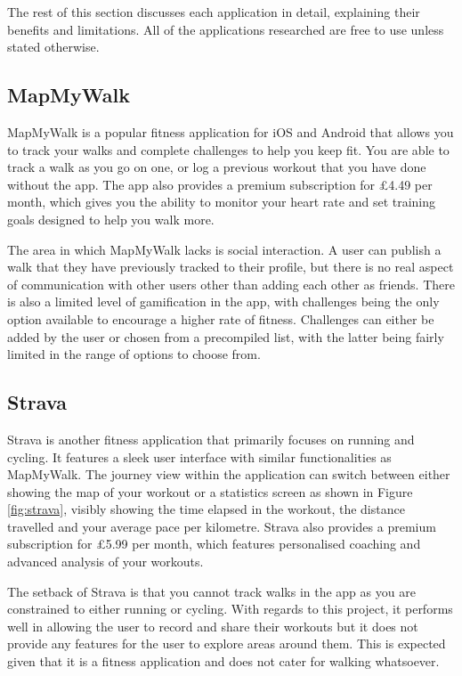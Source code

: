 The rest of this section discusses each application in detail, explaining their benefits and limitations. All of the applications researched are free to use unless stated otherwise.


\subsection{MapMyWalk}

MapMyWalk \cite{Map} is a popular fitness application for iOS and Android that allows you to track your walks and complete challenges to help you keep fit. You are able to track a walk as you go on one, or log a previous workout that you have done without the app. The app also provides a premium subscription for \pounds4.49 per month, which gives you the ability to monitor your heart rate and set training goals designed to help you walk more.

The area in which MapMyWalk lacks is social interaction. A user can publish a walk that they have previously tracked to their profile, but there is no real aspect of communication with other users other than adding each other as friends. There is also a limited level of gamification in the app, with challenges being the only option available to encourage a higher rate of fitness. Challenges can either be added by the user or chosen from a precompiled list, with the latter being fairly limited in the range of options to choose from.

\subsection{Strava}

Strava \cite{StravaInc.} is another fitness application that primarily focuses on running and cycling. It features a sleek user interface with similar functionalities as MapMyWalk. The journey view within the application can switch between either showing the map of your workout or a statistics screen as shown in Figure \ref{fig:strava}, visibly showing the time elapsed in the workout, the distance travelled and your average pace per kilometre. Strava also provides a premium subscription for \pounds5.99 per month, which features personalised coaching and advanced analysis of your workouts.

The setback of Strava is that you cannot track walks in the app as you are constrained to either running or cycling. With regards to this project, it performs well in allowing the user to record and share their workouts but it does not provide any features for the user to explore areas around them. This is expected given that it is a fitness application and does not cater for walking whatsoever.

